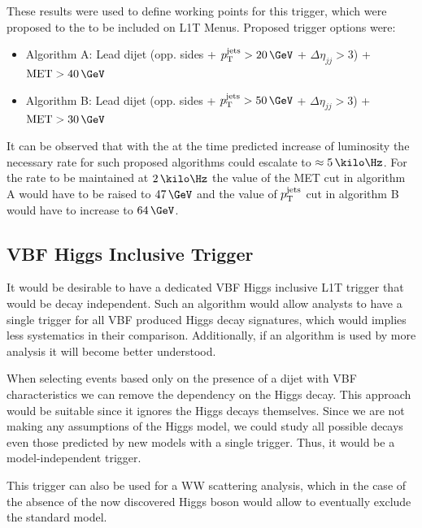 These results were used to define working points for this trigger, which were proposed to the 
to be included on \gls{L1T} Menus. Proposed trigger options were:
\begin{itemize}
\item Algorithm A: Lead dijet (opp. sides + $\pt^{\text{jets}}>20\,\GeV$ + $\Delta\eta_{jj}>3$) + $\text{MET}>40\,\GeV$
\item Algorithm B: Lead dijet (opp. sides + $\pt^{\text{jets}}>50\,\GeV$ + $\Delta\eta_{jj}>3$) + $\text{MET}>30\,\GeV$
\end{itemize}

It can be observed that with the at the time predicted increase of luminosity the necessary rate for such proposed algorithms could escalate to $\approx 5\,\kilo\Hz$. For the rate to be maintained at $2\,\kilo\Hz$ the value of the MET cut in algorithm A would have to be raised to $47\,\GeV$ and the value of $p_{\mathrm{T}}^{\text{jets}}$ cut in algorithm B would have to increase to $64\,\GeV$.

\subsection{VBF Higgs Inclusive Trigger}
\label{SUBSECTION:ParkedDataAnalysis_ParkedTriggerDevelopment_InclusiveHiggsTrigger}

It would be desirable to have a dedicated \gls{VBF} Higgs inclusive \gls{L1T} trigger that would be decay independent. Such an algorithm would allow analysts to have a single trigger for all \gls{VBF} produced Higgs decay signatures, which would implies less systematics in their comparison. Additionally, if an algorithm is used by more analysis it will become better understood.

When selecting events based only on the presence of a dijet with \gls{VBF} characteristics we can remove the dependency on the Higgs decay. This approach would be suitable since it ignores the Higgs decays themselves. Since we are not making any assumptions of the Higgs model, we could study all possible decays even those predicted by new models with a single trigger. Thus, it would be a model-independent trigger.

This trigger can also be used for a WW scattering analysis, which in the case of the absence of the now discovered Higgs boson would allow to eventually exclude the standard model.


